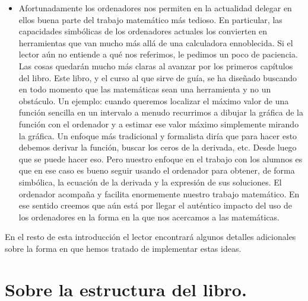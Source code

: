 \begin{itemize}
  \item Afortunadamente los ordenadores nos permiten en la actualidad delegar en ellos buena parte del trabajo matemático más tedioso. En particular, las capacidades simbólicas de los ordenadores actuales los convierten en herramientas que van mucho más allá de una calculadora ennoblecida. Si el lector aún no entiende a qué nos referimos, le pedimos un poco de paciencia. Las cosas quedarán mucho más claras al avanzar por los primeros capítulos del libro. Este libro, y el curso al que sirve de guía, se ha diseñado buscando en todo momento que las matemáticas sean una herramienta y no un obstáculo. Un ejemplo: cuando queremos localizar el máximo valor de una función sencilla en un intervalo a menudo recurrimos a dibujar la gráfica de la función con el ordenador y a estimar ese valor máximo simplemente mirando la gráfica. Un enfoque más tradicional y formalista diría que para hacer esto debemos derivar la función, buscar los ceros de la derivada, etc. Desde luego que se puede hacer eso. Pero nuestro enfoque en el trabajo con los alumnos es que en ese caso es bueno seguir usando el ordenador para obtener, de forma simbólica, la ecuación de la derivada y la expresión de sus soluciones. El ordenador acompaña y facilita enormemente nuestro trabajo matemático. En ese sentido creemos que aún está por llegar el auténtico impacto del uso de los ordenadores en la forma en la que nos acercamos a las matemáticas.
\end{itemize}
En el resto de esta introducción el lector encontrará algunos detalles adicionales sobre la forma en que hemos tratado de implementar estas ideas.



\section*{Sobre la estructura del libro.}

